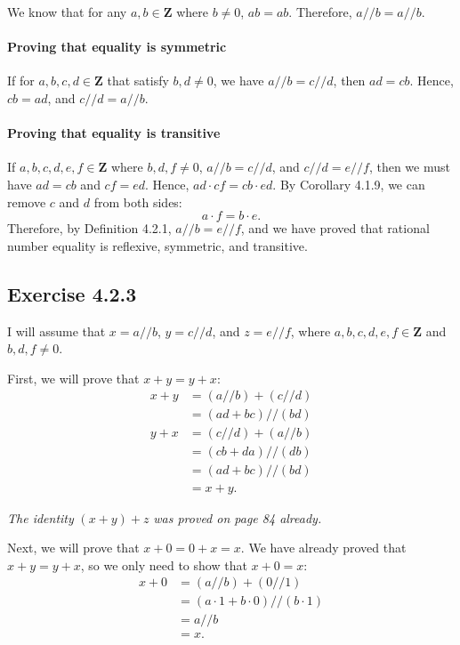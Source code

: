 \documentclass[12pt, oneside]{book}
\begin{document}
	We know that for any $a, b \in \mathbf{Z}$ where $b \ne 0$, $ab = ab$. Therefore, $a // b = a // b$.

	\paragraph*{Proving that equality is symmetric}

	If for $a, b, c, d \in \mathbf{Z}$ that satisfy $b, d \ne 0$, we have $a // b = c // d$, then $ad = cb$. Hence, $cb = ad$, and $c // d = a // b$.

	\paragraph*{Proving that equality is transitive}

	If $a, b, c, d, e, f \in \mathbf{Z}$ where $b, d, f \ne 0$, $a // b = c // d$, and $c // d = e // f$, then we must have $ad = cb$ and $cf = ed$. Hence, $ad \cdot cf = cb \cdot ed$. By Corollary 4.1.9, we can remove $c$ and $d$ from both sides:
	\[a \cdot f = b \cdot e.\]
	Therefore, by Definition 4.2.1, $a // b = e // f$, and we have proved that rational number equality is reflexive, symmetric, and transitive.

	\subsection*{Exercise 4.2.3}

	I will assume that $x = a // b$, $y = c // d$, and $z = e // f$, where $a, b, c, d, e, f \in \mathbf{Z}$ and $b, d, f \ne 0$.

	First, we will prove that $x + y = y + x$:
	\begin{align*}
		x + y &= (a // b) + (c // d) \\
		&= (ad + bc) // (bd) \\
		y + x &= (c // d) + (a // b) \\
		&= (cb + da) // (db) \\
		&= (ad + bc) // (bd) \\
		&= x + y.
	\end{align*}

	\emph{The identity} $(x + y) + z$ \emph{was proved on page 84 already.}

	Next, we will prove that $x + 0 = 0 + x = x$. We have already proved that $x + y = y + x$, so we only need to show that $x + 0 = x$:
	\[\begin{split}
		x + 0 &= (a // b) + (0 // 1) \\
		&= (a \cdot 1 + b \cdot 0) // (b \cdot 1) \\
		&= a // b \\
		&= x.
	\end{split}\]
\end{document}
